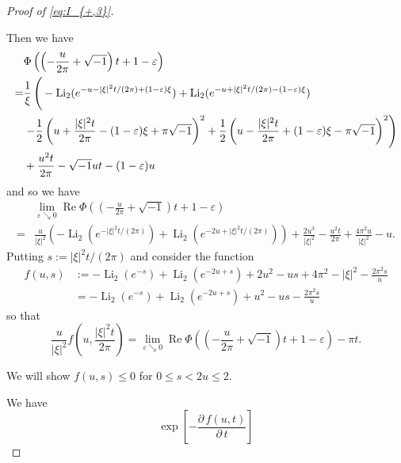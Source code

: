 \documentclass[a4paper]{amsart}
\theoremstyle{plain}
\theoremstyle{definition}
\theoremstyle{remark}
\newcommand{\Li}{\operatorname{Li}}
\renewcommand{\Re}{\operatorname{Re}}
\numberwithin{equation}{section}
\begin{document}
\begin{proof}[Proof of \eqref{eq:I_{+,3}}]
\begin{itemize}
Then we have
\begin{equation*}
\begin{split}
  &\Phi\left(\left(-\frac{u}{2\pi}+\sqrt{-1}\right)t+1-\varepsilon\right)
  \\
  =&
  \frac{1}{\xi}
  \left(
    \vphantom{\left(\frac{|\xi|^2t}{2\pi}\right)^2}
    -
    \Li_2(e^{-u-|\xi|^2t/(2\pi)+(1-\varepsilon)\xi})
    +
    \Li_2(e^{-u+|\xi|^2t/(2\pi)-(1-\varepsilon)\xi})
  \right.
  \\
  &\left.
    -\frac{1}{2}
    \left(
      u+\frac{|\xi|^2t}{2\pi}-(1-\varepsilon)\xi+\pi\sqrt{-1}
    \right)^2
    +\frac{1}{2}
    \left(
      u-\frac{|\xi|^2t}{2\pi}+(1-\varepsilon)\xi-\pi\sqrt{-1}
    \right)^2
  \right)
  \\
  &+
  \frac{u^2t}{2\pi}-\sqrt{-1}ut-(1-\varepsilon)u
\end{split}
\end{equation*}
and so we have
\begin{equation*}
\begin{split}
  &\lim_{\varepsilon\searrow0}
  \Re\Phi\left(\left(-\frac{u}{2\pi}+\sqrt{-1}\right)t+1-\varepsilon\right)
  \\
  =&
  \frac{u}{|\xi|^2}
  \left(
    -
    \Li_2(e^{-|\xi|^2t/(2\pi)})
    +
    \Li_2(e^{-2u+|\xi|^2t/(2\pi)})
  \right)
  +\frac{2u^3}{|\xi|^2}
  -\frac{u^2t}{2\pi}
  +\frac{4\pi^2u}{|\xi|^2}
  -u.
\end{split}
\end{equation*}
Putting $s:=|\xi|^2t/(2\pi)$ and consider the function
\begin{equation*}
\begin{split}
  f(u,s)
  &:=
  -
  \Li_2(e^{-s})
  +
  \Li_2(e^{-2u+s})
  +2u^2
  -us
  +4\pi^2
  -|\xi|^2
  -\frac{2\pi^2s}{u}
  \\
  &=
  -
  \Li_2(e^{-s})
  +
  \Li_2(e^{-2u+s})
  +u^2
  -us-\frac{2\pi^2s}{u}
\end{split}
\end{equation*}
so that
\begin{equation*}
  \frac{u}{|\xi|^2}f\left(u,\frac{|\xi|^2t}{2\pi}\right)
  =
  \lim_{\varepsilon\searrow0}
  \Re\Phi\left(\left(-\frac{u}{2\pi}+\sqrt{-1}\right)t+1-\varepsilon\right)
  -\pi t.
\end{equation*}
\end{itemize}
\par
We will show $f(u,s)\le0$ for $0\le s<2u\le2$.
\par
We have
\begin{equation*}
  \exp\left[-\frac{\partial\,f(u,t)}{\partial\,t}\right]

\end{equation*}
\end{proof}
\end{document}
